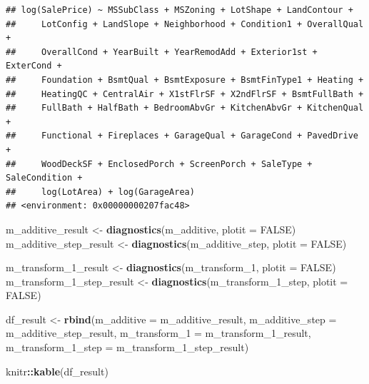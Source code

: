 \documentclass[
]{article}
\newenvironment{Shaded}{\begin{snugshade}}{\end{snugshade}}
\newcommand{\DataTypeTok}[1]{\textcolor[rgb]{0.13,0.29,0.53}{#1}}
\newcommand{\DecValTok}[1]{\textcolor[rgb]{0.00,0.00,0.81}{#1}}
\newcommand{\KeywordTok}[1]{\textcolor[rgb]{0.13,0.29,0.53}{\textbf{#1}}}
\newcommand{\NormalTok}[1]{#1}
\newcommand{\OperatorTok}[1]{\textcolor[rgb]{0.81,0.36,0.00}{\textbf{#1}}}
\newcommand{\OtherTok}[1]{\textcolor[rgb]{0.56,0.35,0.01}{#1}}
\newcommand{\StringTok}[1]{\textcolor[rgb]{0.31,0.60,0.02}{#1}}
\begin{document}
\begin{verbatim}
## log(SalePrice) ~ MSSubClass + MSZoning + LotShape + LandContour + 
##     LotConfig + LandSlope + Neighborhood + Condition1 + OverallQual + 
##     OverallCond + YearBuilt + YearRemodAdd + Exterior1st + ExterCond + 
##     Foundation + BsmtQual + BsmtExposure + BsmtFinType1 + Heating + 
##     HeatingQC + CentralAir + X1stFlrSF + X2ndFlrSF + BsmtFullBath + 
##     FullBath + HalfBath + BedroomAbvGr + KitchenAbvGr + KitchenQual + 
##     Functional + Fireplaces + GarageQual + GarageCond + PavedDrive + 
##     WoodDeckSF + EnclosedPorch + ScreenPorch + SaleType + SaleCondition + 
##     log(LotArea) + log(GarageArea)
## <environment: 0x00000000207fac48>
\end{verbatim}

\begin{Shaded}
\begin{Highlighting}[]
\NormalTok{m_additive_result <-}\StringTok{ }\KeywordTok{diagnostics}\NormalTok{(m_additive, }\DataTypeTok{plotit =} \OtherTok{FALSE}\NormalTok{)}
\NormalTok{m_additive_step_result <-}\StringTok{ }\KeywordTok{diagnostics}\NormalTok{(m_additive_step, }\DataTypeTok{plotit =} \OtherTok{FALSE}\NormalTok{)}

\NormalTok{m_transform_}\DecValTok{1}\NormalTok{_result <-}\StringTok{ }\KeywordTok{diagnostics}\NormalTok{(m_transform_}\DecValTok{1}\NormalTok{, }\DataTypeTok{plotit =} \OtherTok{FALSE}\NormalTok{)}
\NormalTok{m_transform_}\DecValTok{1}\NormalTok{_step_result <-}\StringTok{ }\KeywordTok{diagnostics}\NormalTok{(m_transform_}\DecValTok{1}\NormalTok{_step, }\DataTypeTok{plotit =} \OtherTok{FALSE}\NormalTok{)}

\NormalTok{df_result <-}\StringTok{ }\KeywordTok{rbind}\NormalTok{(}\DataTypeTok{m_additive =}\NormalTok{ m_additive_result, }
                   \DataTypeTok{m_additive_step =}\NormalTok{ m_additive_step_result, }
                   \DataTypeTok{m_transform_1 =}\NormalTok{ m_transform_}\DecValTok{1}\NormalTok{_result, }
                   \DataTypeTok{m_transform_1_step =}\NormalTok{ m_transform_}\DecValTok{1}\NormalTok{_step_result)}

\NormalTok{knitr}\OperatorTok{::}\KeywordTok{kable}\NormalTok{(df_result)}
\end{Highlighting}
\end{Shaded}
\end{document}
